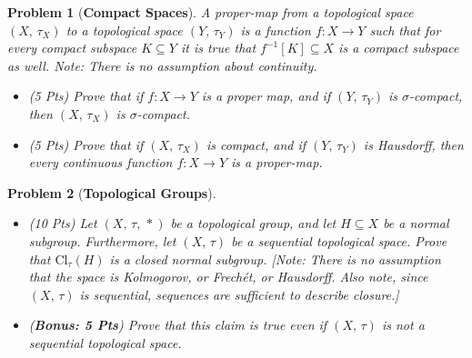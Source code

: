 \documentclass{article}
\theoremstyle{normal}
\newtheorem{problem}{Problem}
\begin{document}
    \begin{problem}[\textbf{Compact Spaces}]
        A \textit{proper-map} from a topological space $(X,\,\tau_{X})$ to a
        topological space $(Y,\,\tau_{Y})$ is a function
        $f:X\rightarrow{Y}$ such that for every compact subspace
        $K\subseteq{Y}$ it is true that $f^{-1}[K]\subseteq{X}$ is a compact
        subspace as well. Note: There is no assumption about continuity.
        \begin{itemize}
            \item (5 Pts) Prove that if $f:X\rightarrow{Y}$ is a proper map,
                and if $(Y,\,\tau_{Y})$ is $\sigma$-compact, then
                $(X,\,\tau_{X})$ is $\sigma$-compact.
            \item (5 Pts) Prove that if $(X,\,\tau_{X})$ is compact, and if
                $(Y,\,\tau_{Y})$ is Hausdorff, then every continuous function
                $f:X\rightarrow{Y}$ is a proper-map.
        \end{itemize}
    \end{problem}
    \begin{problem}[\textbf{Topological Groups}]
        \par\hfill\par
        \begin{itemize}
            \item (10 Pts) Let $(X,\,\tau,\,*)$ be a topological group, and let
                $H\subseteq{X}$ be a normal subgroup. Furthermore, let
                $(X,\,\tau)$ be a sequential topological space. Prove that
                $\textrm{Cl}_{\tau}(H)$ is a closed normal subgroup.
                [Note: There is no assumption that the space is Kolmogorov, or
                Frech\'{e}t, or Hausdorff. Also note, since $(X,\,\tau)$ is
                sequential, sequences are sufficient to describe closure.]
            \item (\textbf{Bonus: 5 Pts}) Prove that this claim is true even
                if $(X,\,\tau)$ is not a sequential topological space.
        \end{itemize}
    \end{problem}
\end{document}
